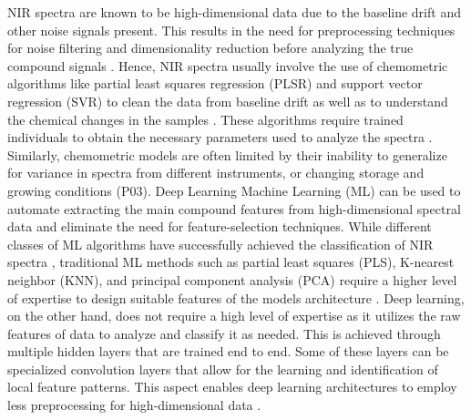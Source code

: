 \documentclass[12pt]{report}
\renewcommand{\cite}{\supercite}
\begin{document}
NIR spectra are known to be high-dimensional data due to the baseline drift and other noise signals present. This results in the need for preprocessing techniques for noise filtering and dimensionality reduction before analyzing the true compound signals \cite{1DConvolutionalNeuralkrohling2023}. Hence,  NIR spectra usually involve the use of chemometric algorithms like partial least squares regression (PLSR) and support vector regression (SVR) to clean the data from baseline drift as well as to understand the chemical changes in the samples \cite{NIRSpectroscopyCombinedshang2023,LinearSupportVectornaguib2014}. These algorithms require trained individuals to obtain the necessary parameters used to analyze the spectra \cite{QuantitativeAnalysisYeastwang2017}. Similarly, chemometric models are often limited by their inability to generalize for variance in spectra from different instruments, or changing storage and growing conditions (P03). Deep Learning \cite{ReviewEvolutionChemometricswalsh2023} Machine Learning (ML) can be used to automate extracting the main compound features from high-dimensional spectral data and eliminate the need for feature-selection techniques. 
While different classes of ML algorithms have successfully achieved the classification of NIR spectra \cite{1DConvolutionalNeuralkrohling2023}, traditional ML methods such as partial least squares (PLS), K-nearest neighbor (KNN), and principal component analysis (PCA) require a higher level of expertise to design suitable features of the models architecture \cite{zhangReviewMachineLearning2022}.  Deep learning, on the other hand, does not require a high level of expertise as it utilizes the raw features of data to analyze and classify it as needed. This is achieved through multiple hidden layers that are trained end to end. Some of these layers can be specialized convolution layers that allow for the learning and identification of local feature patterns. This aspect enables deep learning architectures to employ less preprocessing for high-dimensional data \cite{FastDeepLearningyue2021}. 
\end{document}
